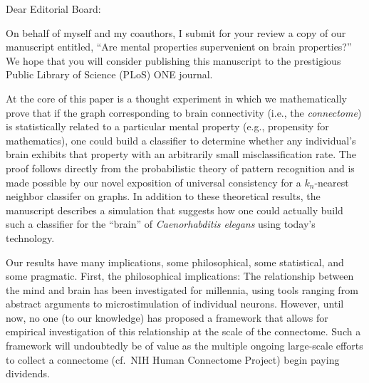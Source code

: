\documentclass[10pt]{letter}
\date{\today}
\begin{document}
\begin{letter}{	%
}   
                           
\opening{Dear Editorial Board:}

On behalf of myself and my coauthors, I submit for your review a copy of our manuscript entitled, ``Are mental properties supervenient on brain properties?'' We hope that you will consider publishing this manuscript to the prestigious Public Library of Science (PLoS) ONE journal.

At the core of this paper is a thought experiment in which we mathematically prove that if the graph corresponding to brain connectivity (i.e., the \emph{connectome}) is statistically related to a particular mental property (e.g., propensity for mathematics), one could build a classifier to determine whether any individual's brain exhibits that property with an arbitrarily small misclassification rate. The proof follows directly from the probabilistic theory of pattern recognition and is made possible by our novel exposition of universal consistency for a $k_n$-nearest neighbor classifer on graphs. In addition to these theoretical results, the manuscript describes a simulation that suggests how one could actually build such a classifier for the ``brain'' of \emph{Caenorhabditis elegans} using today's technology.

Our results have many implications, some philosophical, some statistical, and some pragmatic. First, the philosophical implications: The relationship between the mind and brain has been investigated for millennia, using tools ranging from abstract arguments to microstimulation of individual neurons. However, until now, no one (to our knowledge) has proposed a framework that allows for empirical investigation of this relationship at the scale of the connectome. Such a framework will undoubtedly be of value as the multiple ongoing large-scale efforts to collect a connectome (cf.\ NIH Human Connectome Project) begin paying dividends.


\end{letter}
\end{document}

